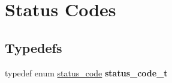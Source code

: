 \hypertarget{group__group__xmega__utils__status__codes}{\section{Status Codes}
\label{group__group__xmega__utils__status__codes}
}
\subsection*{Typedefs}
\begin{DoxyCompactItemize}
\item 
\hypertarget{group__group__xmega__utils__status__codes_ga1f12e07903f974729de22ebe2f52273e}{typedef enum \hyperlink{group__group__xmega__utils__status__codes_ga751c892e5a46b8e7d282085a5a5bf151}{status\-\_\-code} {\bfseries status\-\_\-code\-\_\-t}}\label{group__group__xmega__utils__status__codes_ga1f12e07903f974729de22ebe2f52273e}

\end{DoxyCompactItemize}
